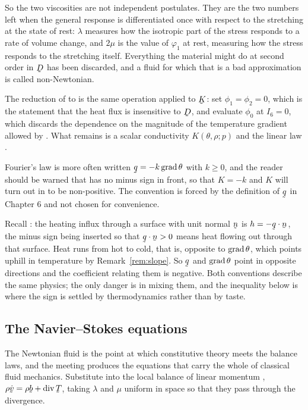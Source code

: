 So the two viscosities are not independent postulates. They are the two
numbers left when the general response  is differentiated once
with respect to the stretching at the state of rest: $\lambda$ measures
how the isotropic part of the stress responds to a rate of volume
change, and $2\mu$ is the value of $\varphi_{1}$ at rest, measuring how
the stress responds to the stretching itself. Everything the material
might do at second order in $\bD$ has been discarded, and a fluid for
which that is a bad approximation is called non-Newtonian.

The reduction of  to  is the same operation applied
to $\bK$: set $\phi_{1}=\phi_{2}=0$, which is the statement that the
heat flux is insensitive to $\bD$, and evaluate $\phi_{0}$ at
$I_{6}=0$, which discards the dependence on the magnitude of the
temperature gradient allowed by . What remains is a scalar
conductivity $K(\theta,\rho;p)$ and the linear law .

\begin{remark}\label{rem:ch9Ksign}
Fourier's law is more often written $\bq=-k\grad\theta$ with $k\geq0$,
and the reader should be warned that  has no minus sign in
front, so that $K=-k$ and $K$ will turn out in  to be
non-positive. The convention is forced by the definition of $\bq$
in Chapter 6 and not chosen for convenience.

Recall : the heating influx through a surface with unit
normal $\bn$ is $h=-\ip\bq\bn$, the minus sign being inserted so that
$\ip\bq\bn>0$ means heat flowing out through that surface. Heat
runs from hot to cold, that is, opposite to $\operatorname{grad}\theta$, which points
uphill in temperature by Remark~\ref{rem:slope}. So $\bq$ and
$\operatorname{grad}\theta$ point in opposite directions and the coefficient relating
them is negative. Both conventions describe the same physics; the only
danger is in mixing them, and the inequality  below is where
the sign is settled by thermodynamics rather than by taste.
\end{remark}

\subsection*{The Navier--Stokes equations}

The Newtonian fluid is the point at which constitutive theory meets the
balance laws, and the meeting produces the equations that carry the
whole of classical fluid mechanics. Substitute  into the local
balance of linear momentum , $\rho\dot\bv=\rho\bb+\dvg\bT$,
taking $\lambda$ and $\mu$ uniform in space so that they pass through
the divergence.

